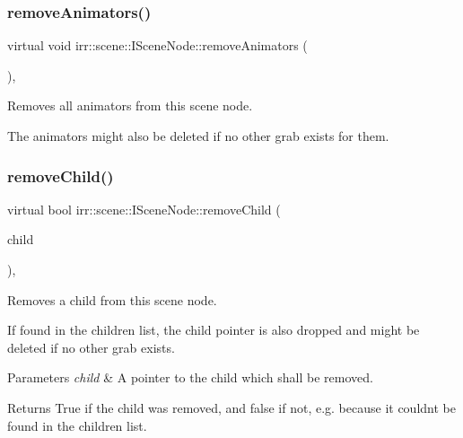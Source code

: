 \subsubsection{\texorpdfstring{remove\+Animators()}{removeAnimators()}\hspace{0.1cm}{\footnotesize\ttfamily [2/2]}}
{\footnotesize\ttfamily virtual void irr\+::scene\+::\+I\+Scene\+Node\+::remove\+Animators (\begin{DoxyParamCaption}{ }\end{DoxyParamCaption})\hspace{0.3cm}{\ttfamily [inline]}, {\ttfamily [virtual]}}



Removes all animators from this scene node. 

The animators might also be deleted if no other grab exists for them. \mbox{\label{classirr_1_1scene_1_1ISceneNode_a831e371142fc883c7dd229552e0340de}} 
\subsubsection{\texorpdfstring{remove\+Child()}{removeChild()}\hspace{0.1cm}{\footnotesize\ttfamily [1/2]}}
{\footnotesize\ttfamily virtual bool irr\+::scene\+::\+I\+Scene\+Node\+::remove\+Child (\begin{DoxyParamCaption}\item[{\hyperlink{classirr_1_1scene_1_1ISceneNode}{I\+Scene\+Node} $\ast$}]{child }\end{DoxyParamCaption})\hspace{0.3cm}{\ttfamily [inline]}, {\ttfamily [virtual]}}



Removes a child from this scene node. 

If found in the children list, the child pointer is also dropped and might be deleted if no other grab exists. 
\begin{DoxyParams}{Parameters}
{\em child} & A pointer to the child which shall be removed. \\
\hline
\end{DoxyParams}
\begin{DoxyReturn}{Returns}
True if the child was removed, and false if not, e.\+g. because it couldn\textquotesingle{}t be found in the children list. 
\end{DoxyReturn}
\mbox{\label{classirr_1_1scene_1_1ISceneNode_a831e371142fc883c7dd229552e0340de}} 
